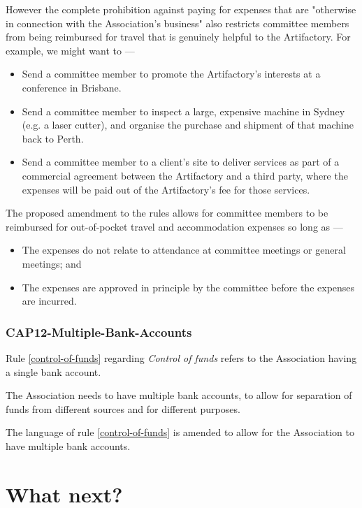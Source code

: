 \documentclass[../constitution.tex]{subfiles}
\begin{document}
However the complete prohibition against paying for expenses that are "otherwise in connection with the Association's business" also restricts committee members from being reimbursed for travel that is genuinely helpful to the Artifactory. For example, we might want to ---

\begin{itemize}
    \item Send a committee member to promote the Artifactory's interests at a conference in Brisbane.
    \item Send a committee member to inspect a large, expensive machine in Sydney (e.g. a laser cutter), and organise the purchase and shipment of that machine back to Perth.
    \item Send a committee member to a client's site to deliver services as part of a commercial agreement between the Artifactory and a third party, where the expenses will be paid out of the Artifactory's fee for those services.
\end{itemize}

The proposed amendment to the rules allows for committee members to be reimbursed for out-of-pocket travel and accommodation expenses so long as ---

\begin{itemize}
    \item The expenses do not relate to attendance at committee meetings or general meetings; and
    \item The expenses are approved in principle by the committee before the expenses are incurred.
\end{itemize}


\section*{CAP12-Multiple-Bank-Accounts}

Rule \ref{control-of-funds} regarding \textit{Control of funds} refers to the Association having a single bank account.

The Association needs to have multiple bank accounts, to allow for separation of funds from different sources and for different purposes.

The language of rule \ref{control-of-funds} is amended to allow for the Association to have multiple bank accounts.

\part*{What next?}
\end{document}

